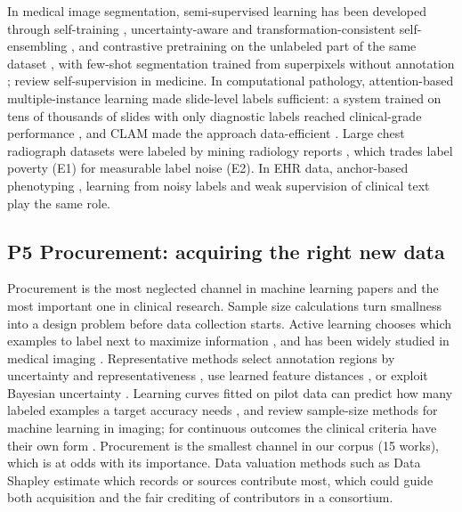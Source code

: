 \documentclass[acmsmall,screen,review]{acmart}
\theoremstyle{acmdefinition}
\begin{document}
In medical image segmentation, semi-supervised learning has been developed through self-training \cite{bai2017semi}, uncertainty-aware and transformation-consistent self-ensembling \cite{li2021transformation,yu2019uncertainty}, and contrastive pretraining on the unlabeled part of the same dataset \cite{chaitanya2020contrastive,taleb20203d}, with few-shot segmentation trained from superpixels without annotation \cite{ouyang2020self}; \citet{krishnan2022self} review self-supervision in medicine. In computational pathology, attention-based multiple-instance learning \cite{ilse2018attention} made slide-level labels sufficient: a system trained on tens of thousands of slides with only diagnostic labels reached clinical-grade performance \cite{campanella2019clinical}, and CLAM made the approach data-efficient \cite{lu2021data}. Large chest radiograph datasets were labeled by mining radiology reports \cite{irvin2019chexpert,wang2017chestx}, which trades label poverty (E1) for measurable label noise (E2). In EHR data, anchor-based phenotyping \cite{halpern2016electronic}, learning from noisy labels \cite{agarwal2016learning} and weak supervision of clinical text \cite{fries2019weakly,wang2019clinical} play the same role.

\subsection{P5 Procurement: acquiring the right new data}\label{sec:S6_5}

 Procurement is the most neglected channel in machine learning papers and the most important one in clinical research. Sample size calculations \cite{riley2020calculating} turn smallness into a design problem before data collection starts. Active learning chooses which examples to label next to maximize information \cite{settles2009active}, and has been widely studied in medical imaging \cite{budd2021survey}. Representative methods select annotation regions by uncertainty and representativeness \cite{yang2017suggestive}, use learned feature distances \cite{smailagic2018medal}, or exploit Bayesian uncertainty \cite{gal2017deep,nath2021diminishing}. Learning curves fitted on pilot data can predict how many labeled examples a target accuracy needs \cite{cho2015much,figueroa2012predicting}, and \citet{balki2019sample} review sample-size methods for machine learning in imaging; for continuous outcomes the clinical criteria have their own form \cite{riley2019minimum}. Procurement is the smallest channel in our corpus (15 works), which is at odds with its importance. Data valuation methods such as Data Shapley \cite{ghorbani2019data} estimate which records or sources contribute most, which could guide both acquisition and the fair crediting of contributors in a consortium.
\end{document}
